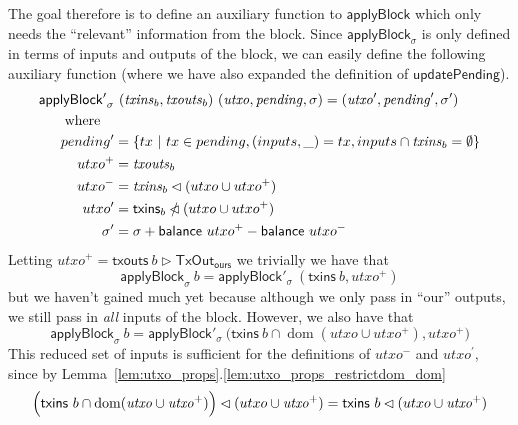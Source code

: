 \documentclass{article}
\newcommand{\restrictdom}{\lhd}
\newcommand{\subtractdom}{\mathbin{\slashed{\restrictdom}}}
\newcommand{\restrictrange}{\rhd}
\DeclareMathOperator{\dom}{dom}
\begin{document}
The goal therefore is to define an auxiliary function to $\mathsf{applyBlock}$
which only needs the ``relevant'' information from the block.
Since $\mathsf{applyBlock}_\sigma$ is only defined in terms of inputs and
outputs of the block, we can easily define the following auxiliary function
(where we have also expanded the definition of $\mathsf{updatePending}$).
%
\begin{equation*}
\begin{split}
\mathsf{applyBlock'}_\sigma & ~ (\mathit{txins}_b, \mathit{txouts}_b) ~ (\mathit{utxo}, \mathit{pending}, \sigma) = (\mathit{utxo}^\prime, \mathit{pending}^\prime, \sigma^\prime) \\
\text{where} \quad \\
    pending^\prime & = \{ tx ~|~ tx \in pending, (inputs, \_) = tx, inputs \cap \mathit{txins}_b = \emptyset \} \\
    utxo^+ & = \mathit{txouts}_b \\
    utxo^- & = \mathit{txins}_b \restrictdom (utxo \cup utxo^+) \\
    utxo^\prime & = \mathsf{txins}_b \subtractdom (utxo \cup utxo^+) \\
    \sigma^\prime & = \sigma + \mathsf{balance} ~ utxo^+ - \mathsf{balance} ~ utxo^- \\
\end{split}
\end{equation*}
%
Letting
%
\begin{math}
\mathit{utxo}^+ = \mathsf{txouts} ~ b \restrictrange \mathsf{TxOut_{ours}}
\end{math}
%
we trivially we have that
%
\begin{equation}
  \mathsf{applyBlock}_\sigma ~ b
= \mathsf{applyBlock}'_\sigma ~ (\mathsf{txins} ~ b, \mathit{utxo}^+)
\end{equation}
%
but we haven't gained much yet because although we only pass in ``our'' outputs,
we still pass in \emph{all} inputs of the block. However, we also have that
%
\begin{equation}
  \mathsf{applyBlock}_\sigma ~ b
= \mathsf{applyBlock}'_\sigma ~ \Big( \mathsf{txins} ~ b \cap \dom (\mathit{utxo} \cup \mathit{utxo}^+), \mathit{utxo}^+ \Bigr)
\end{equation}
%
This reduced set of inputs is sufficient for the definitions of
$\mathit{utxo}^-$ and $\mathit{utxo}^\prime$, since by
Lemma~\ref{lem:utxo_props}.\ref{lem:utxo_props_restrictdom_dom}
%
\begin{equation*}
  \Bigl( \mathsf{txins} ~ b \cap \dom (\mathit{utxo} \cup \mathit{utxo}^+) \Bigr) \restrictdom (utxo \cup \mathit{utxo}^+) \\
= \mathsf{txins} ~ b \restrictdom (utxo \cup \mathit{utxo}^+)
\end{equation*}
\end{document}
